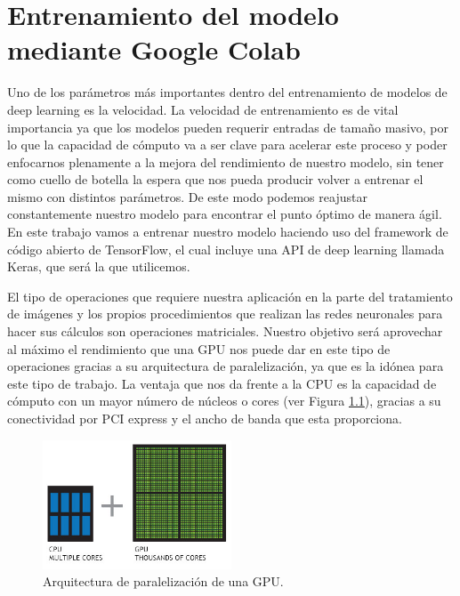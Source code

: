 \mbox{}


\chapter{Entrenamiento del modelo mediante Google Colab}
\label{ch:chapter2}
Uno de los parámetros más importantes dentro del entrenamiento de modelos de deep learning es la velocidad.
La velocidad de entrenamiento es de vital importancia ya que los modelos pueden requerir entradas de tamaño masivo, por lo que la capacidad de cómputo
va a ser clave para acelerar este proceso y poder enfocarnos plenamente a la mejora del rendimiento de nuestro modelo, sin tener como cuello de botella la espera
que nos pueda producir volver a entrenar el mismo con distintos parámetros.
De este modo podemos reajustar constantemente nuestro modelo para encontrar el punto óptimo de manera ágil.
En este trabajo vamos a entrenar nuestro modelo haciendo uso del framework de código abierto de TensorFlow, el cual incluye una API de deep learning llamada Keras, que será la que utilicemos.

El tipo de operaciones que requiere nuestra aplicación en la parte del tratamiento de imágenes y los propios procedimientos que realizan las redes neuronales
para hacer sus cálculos son operaciones matriciales.
Nuestro objetivo será aprovechar al máximo el rendimiento que una GPU nos puede dar en este tipo de operaciones gracias
a su arquitectura de paralelización, ya que es la idónea para este tipo de trabajo.
La ventaja que nos da frente a la CPU es la capacidad de cómputo con un mayor número de núcleos o cores (ver Figura \ref{fig:Arquitectura de paralelización de una GPU}), gracias a su conectividad por PCI express y el ancho de banda que esta proporciona.

\begin{figure}
    \centering
    \includegraphics[width=0.5\textwidth]{images/chapter2/cpu-and-gpu.jpg}
    \caption{Arquitectura de paralelización de una GPU.}
    \label{fig:Arquitectura de paralelización de una GPU}
\end{figure}


